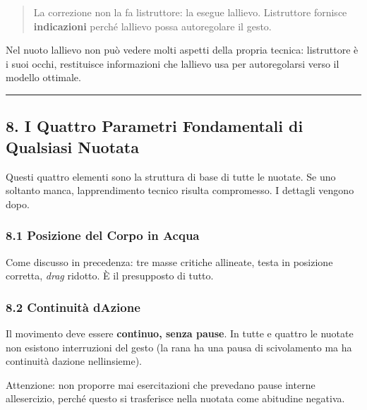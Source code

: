 \documentclass[a4paper,11pt]{article}
\begin{document}
\begin{quote}
      La correzione non la fa l\textquotesingle istruttore: la esegue
      l\textquotesingle allievo. L\textquotesingle istruttore fornisce
      \textbf{indicazioni} perché l\textquotesingle allievo possa autoregolare
      il gesto.
\end{quote}

Nel nuoto l\textquotesingle allievo non può vedere molti aspetti della
propria tecnica: l\textquotesingle istruttore è i suoi occhi,
restituisce informazioni che l\textquotesingle allievo usa per
autoregolarsi verso il modello ottimale.

\begin{center}\rule{0.5\linewidth}{0.5pt}\end{center}

\subsection{8. I Quattro Parametri Fondamentali di Qualsiasi
      Nuotata}\label{i-quattro-parametri-fondamentali-di-qualsiasi-nuotata}

Questi quattro elementi sono la struttura di base di tutte le nuotate.
Se uno soltanto manca, l\textquotesingle apprendimento tecnico risulta
compromesso. I dettagli vengono dopo.

\subsubsection{8.1 Posizione del Corpo in
      Acqua}\label{posizione-del-corpo-in-acqua}

Come discusso in precedenza: tre masse critiche allineate, testa in
posizione corretta, \emph{drag} ridotto. È il presupposto di tutto.

\subsubsection{8.2 Continuità
      d\textquotesingle Azione}\label{continuituxe0-dazione}

Il movimento deve essere \textbf{continuo, senza pause}. In tutte e
quattro le nuotate non esistono interruzioni del gesto (la rana ha una
pausa di scivolamento ma ha continuità d\textquotesingle azione
nell\textquotesingle insieme).

Attenzione: non proporre mai esercitazioni che prevedano pause interne
all\textquotesingle esercizio, perché questo si trasferisce nella
nuotata come abitudine negativa.
\end{document}
